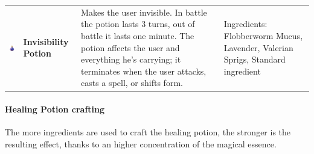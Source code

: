 \begin{tabular}{m{2cm}m{2cm}m{6cm}m{5cm} }
	\includegraphics[width=2cm]{../Pictures/Gameplay/Items/Consumables/Potions/Invisibility_potion_picture.png} & \textbf{Invisibility Potion} & Makes the user invisible. In battle the potion lasts 3 turns, out of battle it lasts one minute. The potion affects the user and everything he's carrying; it terminates when the user attacks, casts a spell, or shifts form. & Ingredients: Flobberworm Mucus, Lavender, Valerian Sprigs, Standard ingredient \\ 
\end{tabular}

\clearpage

\paragraph {Healing Potion crafting}
The more ingredients are used to craft the healing potion, the stronger is the resulting effect, thanks to an higher concentration of the magical essence.

